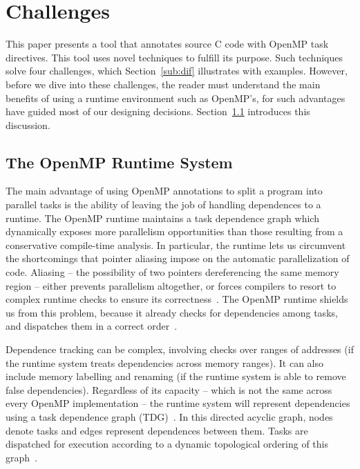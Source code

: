 \documentclass[sigplan,10pt,review,anonymous]{acmart}
\begin{document}
\section{Challenges}
\label{sec:ovf}

This paper presents a tool that annotates source C code with OpenMP task
directives.
This tool uses novel techniques to fulfill its purpose.
Such techniques solve four challenges, which Section~\ref{sub:dif}
illustrates with examples.
However, before we dive into these challenges, the reader must understand
the main benefits of using a runtime environment such as OpenMP's, for
such advantages have guided most of our designing decisions.
Section~\ref{sub:adv} introduces this discussion.

\subsection{The OpenMP Runtime System}
\label{sub:adv}

The main advantage of using OpenMP annotations to split a program into parallel
tasks is
the ability  of leaving the job of  handling dependences to a runtime.
The OpenMP runtime maintains a task dependence graph which dynamically exposes more parallelism 
opportunities than those resulting from a conservative  compile-time  analysis.
In particular, the runtime lets us circumvent the shortcomings that pointer aliasing
impose on the automatic parallelization of code.
Aliasing -- the possibility of two pointers dereferencing the same
memory region -- either prevents parallelism altogether, or forces compilers to
resort to complex runtime checks to ensure its
correctness~\cite{Alves15,Ravishankar14}.
The OpenMP runtime shields us from this problem, because
it already checks for dependencies among tasks, and dispatches them in a
correct order~\cite{LaGrone11}.

Dependence tracking can be complex, involving checks over ranges of addresses
(if the runtime system treats dependencies across memory ranges).
It can also include memory labelling and renaming (if the
runtime system is able to remove false dependencies).
Regardless of its capacity -- which is not the same across every OpenMP
implementation -- the runtime system will represent dependencies using a task
dependence graph (TDG)~\cite{Duran08}.
In this directed acyclic graph, nodes denote tasks and edges represent
dependences between them.
Tasks are dispatched for execution according to a dynamic topological ordering of
this graph~\cite{Planas15}.
\end{document}
